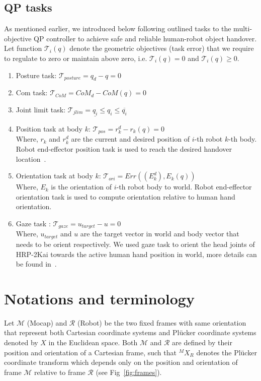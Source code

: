 \subsection{QP tasks}\label{QPTasks}
As mentioned earlier, we introduced below following outlined tasks to the multi-objective QP controller to achieve safe and reliable human-robot object handover. Let function $\mathscr{T}_i(q)$ denote the geometric objectives (task error) that we require to regulate to zero or maintain above zero, i.e. $\mathscr{T}_i(q) = 0$ and $\mathscr{T}_i(q) \geq 0$.  

\begin{enumerate}[start=1,label={\bf\arabic*.}]

\item Posture task: $\mathscr{T}_{posture} = q_d - q = 0$  

\item Com task: $\mathscr{T}_{CoM} = CoM_d - CoM(q) = 0$

\item Joint limit task: $\mathscr{T}_{jlim} = \underline{q_i} \leq q_i \leq \overline{q_i}$  

\item Position task at body $k$: $\mathscr{T}_{pos} = r^d_k - r_k(q) = 0$\\
Where, $r_k$ and $r^d_k$ are the current and desired position of $i$-th robot $k$-th body. Robot end-effector position task is used to reach the desired handover location~\cite{ladder-HRP-2Kai}.

\item Orientation task at body $k$: $\mathscr{T}_{ori} = Err((E^d_k),  E_k(q))$\\
Where, $E_k$ is the orientation of $i$-th robot body to world. Robot end-effector orientation task is used to compute orientation relative to human hand orientation.

\item Gaze task : $\mathscr{T}_{gaze} =u_{target} - u = 0$\\
Where, $u_{target}$  and $u$ are the target vector in world and body vector that needs to be orient respectively. We used gaze task to orient the head joints of HRP-2Kai towards the active human hand position in world, more details can be found in~\cite{samy2017VecOriTask}.

\end{enumerate}



\section{Notations and terminology}
Let $\mathcal{M}$ (Mocap) and $\mathcal{R}$ (Robot) be the two fixed frames with same orientation that represent both Cartesian coordinate systems and Pl\"ucker coordinate systems denoted by $X$ in the Euclidean space. Both $\mathcal{M}$ and $\mathcal{R}$ are defined by their position and orientation of a Cartesian frame, such that ${}^MX_R$ denotes the Pl\"ucker coordinate transform which depends only on the position and orientation of frame $\mathcal{M}$ relative to frame $\mathcal{R}$ (see Fig~\ref{fig:frames}).

